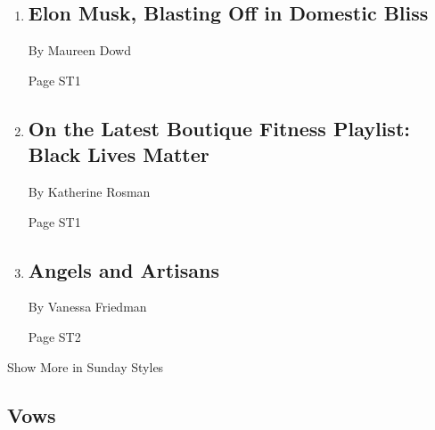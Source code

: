 \begin{enumerate}
\def\labelenumi{\arabic{enumi}.}
\item
  \href{/2020/07/25/style/elon-musk-maureen-dowd.html}{}

  \hypertarget{elon-musk-blasting-off-in-domestic-bliss}{%
  \subsection{Elon Musk, Blasting Off in Domestic
  Bliss}\label{elon-musk-blasting-off-in-domestic-bliss}}

  By Maureen Dowd

  Page ST1
\item
  \href{/2020/07/23/style/peloton-black-lives-matter-ride-soul-cycle-y7.html}{}

  \hypertarget{on-the-latest-boutique-fitness-playlist-black-lives-matter}{%
  \subsection{On the Latest Boutique Fitness Playlist: Black Lives
  Matter}\label{on-the-latest-boutique-fitness-playlist-black-lives-matter}}

  By Katherine Rosman

  Page ST1
\item
  \href{/2020/07/23/style/valentino-dior-fashion-shows.html}{}

  \hypertarget{angels-and-artisans}{%
  \subsection{Angels and Artisans}\label{angels-and-artisans}}

  By Vanessa Friedman

  Page ST2
\end{enumerate}

Show More in Sunday Styles

\hypertarget{vows}{%
\subsection{Vows}\label{vows}}

